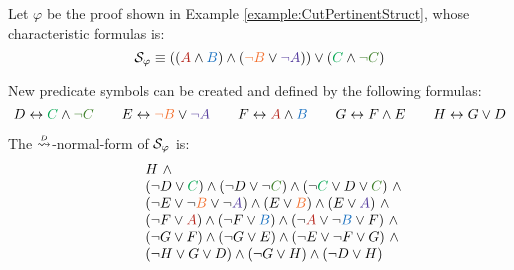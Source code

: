\begin{example}
\label{example:PlusTimesDefinitionalNormalization}
Let $\varphi$ be the proof shown in Example \ref{example:CutPertinentStruct}, whose characteristic formulas is:
$$
\struct{\varphi} 
\equiv 
((\hA{A} \structplus \hB{B}) \structplus (\hC{\structdual{B}} \structtimes \hD{\structdual{A}}))
\structtimes
(\hE{C} \structplus \hF{\structdual{C}})
$$

\noindent
New predicate symbols can be created and defined by the following formulas: 
$$
D \biimp \hE{C} \structplus \hF{\structdual{C}}
\qquad
E \biimp \hC{\structdual{B}} \structtimes \hD{\structdual{A}}
\qquad
F \biimp \hA{A} \structplus \hB{B}
\qquad
G \biimp F \structplus E
\qquad
H \biimp G \structtimes D
$$

\noindent
The $\normalizePlusTimesD$-normal-form of $\mathcal{S}_{\varphi}$ is:
$$
\begin{array}{rcl}
&           & H \ \structplus \\
&			& 
(\structdual D \structtimes \hE{C})
\structplus
(\structdual D \structtimes \structdual \hF{C})
\structplus
( \structdual \hE{C} \structtimes D \structtimes \hF{C}) \ \structplus \\
&			&
(\structdual E \structtimes \structdual \hC{B} \structtimes \structdual \hD{A} )
\structplus
(E \structtimes \hC{B})
\structplus
(E \structtimes \hD{A}) \ \structplus \\
&			&
(\structdual F \structtimes \hA{A})
\structplus
(\structdual F \structtimes \hB{B})
\structplus
(\structdual \hA{A} \structtimes \structdual \hB{B} \structtimes F) \ \structplus \\
&			&
(\structdual G \structtimes F)
\structplus
(\structdual G \structtimes E)
\structplus
(\structdual E \structtimes \structdual F \structtimes G) \ \structplus \\
&			&
(\structdual H \structtimes G \structtimes D)
\structplus
(\structdual G \structtimes H)
\structplus
(\structdual D \structtimes H) \\
\end{array}
$$


\end{example}
